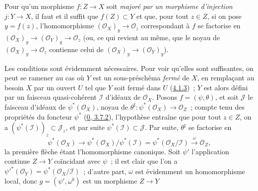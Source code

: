 \begin{proposition}[4.1.9]
\label{I.4.1.9-fr}
Pour qu'un morphisme $f:Z\to X$ soit \emph{majoré par un morphisme
d'injection} $j:Y\to X$, il faut et il suffit que $f(Z)\subset Y$ et que,
pour tout $z\in Z$, si on pose $y=f(z)$, l'homomorphisme
$(\mathscr{O}_X)_y\to\mathscr{O}_z$ correspondant à $f$ se factorise en
$(\mathscr{O}_X)_y\to(\mathscr{O}_Y)_y\to\mathscr{O}_z$ (ou, ce qui revient
au même, que le noyau de $(\mathscr{O}_X)_y\to\mathscr{O}_z$ contienne celui
de $(\mathscr{O}_X)_y\to(\mathscr{O}_Y)_y$).
\end{proposition}

Les conditions sont évidemment nécessaires. Pour voir qu'elles sont
suffisantes, on peut se ramener au cas où $Y$ est un sous-préschéma
\emph{fermé} de $X$, en remplaçant au besoin $X$ par un ouvert $U$ tel que
$Y$ soit fermé dans $U$ (\hyperref[I.4.1.3-fr]{4.1.3})~; $Y$ est alors défini
par un faisceau quasi-cohérent $\mathscr{I}$ d'idéaux de $\mathscr{O}_X$.
Posons $f=(\psi,\theta)$, et soit $\mathscr{J}$ le faisceau d'idéaux de
$\psi^*(\mathscr{O}_X)$, noyau de
$\theta^\sharp:\psi^*(\mathscr{O}_X)\to\mathscr{O}_Z$~; compte tenu des
propriétés du foncteur $\psi^*$ (\hyperref[0.3.7.2-fr]{0, 3.7.2}),
l'hypothèse entraîne que pour tout $z\in Z$, on a
$(\psi^*(\mathscr{I}))_z\subset\mathscr{J}_z$, et par suite
$\psi^*(\mathscr{I})\subset\mathscr{J}$. Par suite, $\theta^\sharp$ se
factorise en
\[
  \psi^*(\mathscr{O}_X)\longrightarrow
  \psi^*(\mathscr{O}_X)/\psi^*(\mathscr{I})
  =\psi^*(\mathscr{O}_X/\mathscr{I})
  \xrightarrow{\omega}\mathscr{O}_Z,
\]
la première flèche étant l'homomorphisme canonique. Soit $\psi'$ l'application
continue $Z\to Y$ coïncidant avec $\psi$~; il est clair que l'on a
${\psi'}^*(\mathscr{O}_Y)=\psi^*(\mathscr{O}_X/\mathscr{I})$~; d'autre part,
$\omega$ est évidemment un homomorphisme local, donc
$g=(\psi',\omega^b)$ est un morphisme $Z\to Y$
